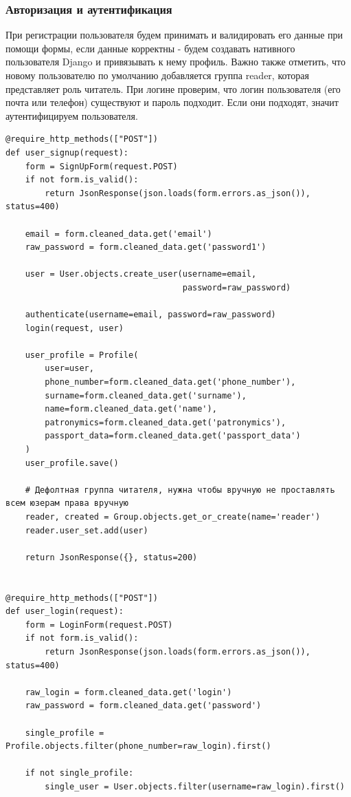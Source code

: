 \documentclass[a4paper,14pt]{extarticle}
\begin{document}
\subsubsection{Авторизация и аутентификация}
При регистрации пользователя будем принимать и валидировать его данные при помощи формы, если данные корректны - 
будем создавать нативного пользователя Django и привязывать к нему профиль. Важно также отметить, что 
новому пользователю по умолчанию добавляется группа reader, которая представляет роль читатель. При
логине проверим, что логин пользователя (его почта или телефон) существуют и пароль подходит. Если они подходят, 
значит аутентифицируем пользователя.
\begin{verbatim}
@require_http_methods(["POST"])
def user_signup(request):
    form = SignUpForm(request.POST)
    if not form.is_valid():
        return JsonResponse(json.loads(form.errors.as_json()), status=400)

    email = form.cleaned_data.get('email')
    raw_password = form.cleaned_data.get('password1')

    user = User.objects.create_user(username=email,
                                    password=raw_password)

    authenticate(username=email, password=raw_password)
    login(request, user)

    user_profile = Profile(
        user=user,
        phone_number=form.cleaned_data.get('phone_number'),
        surname=form.cleaned_data.get('surname'),
        name=form.cleaned_data.get('name'),
        patronymics=form.cleaned_data.get('patronymics'),
        passport_data=form.cleaned_data.get('passport_data')
    )
    user_profile.save()

    # Дефолтная группа читателя, нужна чтобы вручную не проставлять всем юзерам права вручную
    reader, created = Group.objects.get_or_create(name='reader')
    reader.user_set.add(user)

    return JsonResponse({}, status=200)


@require_http_methods(["POST"])
def user_login(request):
    form = LoginForm(request.POST)
    if not form.is_valid():
        return JsonResponse(json.loads(form.errors.as_json()), status=400)

    raw_login = form.cleaned_data.get('login')
    raw_password = form.cleaned_data.get('password')

    single_profile = Profile.objects.filter(phone_number=raw_login).first()

    if not single_profile:
        single_user = User.objects.filter(username=raw_login).first()


\end{verbatim}
\end{document}
